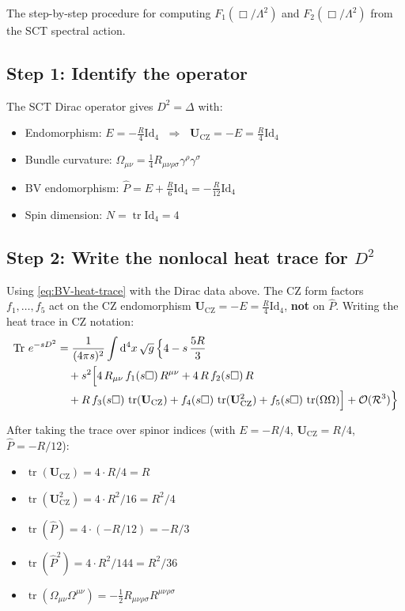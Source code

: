 \documentclass[12pt,a4paper]{article}
\theoremstyle{definition}
\theoremstyle{remark}
\newcommand{\Tr}{\operatorname{Tr}}
\newcommand{\tr}{\operatorname{tr}}
\newcommand{\Rsq}{R_{\mu\nu\rho\sigma}R^{\mu\nu\rho\sigma}}
\newcommand{\dd}{\mathrm{d}}
\newcommand{\Id}{\mathrm{Id}}
\begin{document}
The step-by-step procedure for computing $F_1(\Box/\Lambda^2)$ and
$F_2(\Box/\Lambda^2)$ from the SCT spectral action.

\subsection{Step 1: Identify the operator}

The SCT Dirac operator gives $D^2 = \Delta$ with:
\begin{itemize}
\item Endomorphism: $E = -\frac{R}{4}\Id_4$
  $\;\Longrightarrow\;$ $\mathbf{U}_{\text{CZ}} = -E = \frac{R}{4}\Id_4$
\item Bundle curvature:
  $\Omega_{\mu\nu} = \frac{1}{4}R_{\mu\nu\rho\sigma}\gamma^\rho\gamma^\sigma$
\item BV endomorphism:
  $\hat{P} = E + \frac{R}{6}\Id_4 = -\frac{R}{12}\Id_4$
\item Spin dimension: $N = \tr\Id_4 = 4$
\end{itemize}


\subsection{Step 2: Write the nonlocal heat trace for $D^2$}

Using \eqref{eq:BV-heat-trace} with the Dirac data above.
The CZ form factors $f_1, \ldots, f_5$ act on the CZ endomorphism
$\mathbf{U}_{\text{CZ}} = -E = \frac{R}{4}\Id_4$, \textbf{not} on
$\hat{P}$.  Writing the heat trace in CZ notation:
\begin{equation}
  \begin{aligned}
  \Tr\,e^{-sD^2}
  &= \frac{1}{(4\pi s)^2}
  \int\dd^4 x\,\sqrt{g}\,\Bigl\{
  4 - s\,\frac{5R}{3}\\
  &\quad+ s^2\Bigl[
  4\,R_{\mu\nu}\,f_1(s\Box)\,R^{\mu\nu}
  + 4\,R\,f_2(s\Box)\,R\\
  &\quad+ R\,f_3(s\Box)\,\tr(\mathbf{U}_{\text{CZ}})
  + f_4(s\Box)\,\tr(\mathbf{U}_{\text{CZ}}^2)
  + f_5(s\Box)\,\tr(\Omega\Omega)
  \Bigr]
  + \mathcal{O}(\mathcal{R}^3)
  \Bigr\}
  \end{aligned}
  \label{eq:heat-trace-dirac}
\end{equation}

After taking the trace over spinor indices (with $E = -R/4$,
$\mathbf{U}_{\text{CZ}} = R/4$, $\hat{P} = -R/12$):
\begin{itemize}
\item $\tr(\mathbf{U}_{\text{CZ}}) = 4\cdot R/4 = R$
\item $\tr(\mathbf{U}_{\text{CZ}}^2) = 4\cdot R^2/16 = R^2/4$
\item $\tr(\hat{P}) = 4\cdot(-R/12) = -R/3$
\item $\tr(\hat{P}^2) = 4\cdot R^2/144 = R^2/36$
\item $\tr(\Omega_{\mu\nu}\Omega^{\mu\nu}) = -\frac{1}{2}\Rsq$
\end{itemize}
\end{document}
